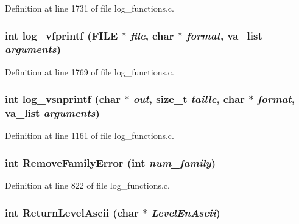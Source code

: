 Definition at line 1731 of file log\_\-functions.c.
\subsubsection[{log\_\-vfprintf}]{\setlength{\rightskip}{0pt plus 5cm}int log\_\-vfprintf (FILE $\ast$ {\em file}, \/  char $\ast$ {\em format}, \/  va\_\-list {\em arguments})}\label{log__functions_8c_488cd97cc3d1d84a29a53f22f862b406}




Definition at line 1769 of file log\_\-functions.c.
\subsubsection[{log\_\-vsnprintf}]{\setlength{\rightskip}{0pt plus 5cm}int log\_\-vsnprintf (char $\ast$ {\em out}, \/  size\_\-t {\em taille}, \/  char $\ast$ {\em format}, \/  va\_\-list {\em arguments})}\label{log__functions_8c_153252e2eb446698ace7578b7d89869b}




Definition at line 1161 of file log\_\-functions.c.
\subsubsection[{RemoveFamilyError}]{\setlength{\rightskip}{0pt plus 5cm}int RemoveFamilyError (int {\em num\_\-family})}\label{log__functions_8c_1b19289105c743efc10722319e439dc9}




Definition at line 822 of file log\_\-functions.c.
\subsubsection[{ReturnLevelAscii}]{\setlength{\rightskip}{0pt plus 5cm}int ReturnLevelAscii (char $\ast$ {\em LevelEnAscii})}\label{log__functions_8c_20ca1cc100b80770b16aac5370ab8dcf}




